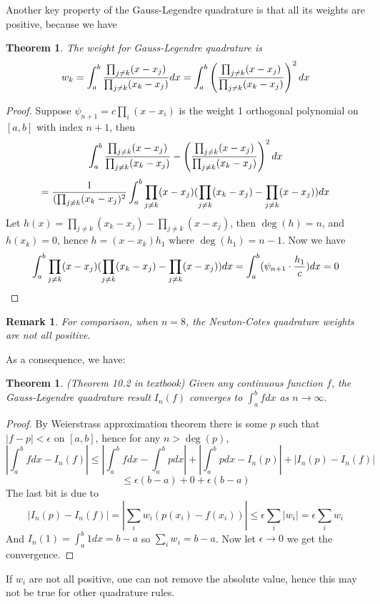 \documentclass[20pt]{article} %
\theoremstyle{break}
\newtheorem{thm}[definition]{Theorem}
\newtheorem{rem}[definition]{Remark}
\begin{document}
Another key property of the Gauss-Legendre quadrature is that all its weights are positive, because we have
\begin{thm}\label{pos_wt}
  The weight for Gauss-Legendre quadrature is
  \[w_k=\int_a^b{\prod_{j\not=k}(x-x_j)\over \prod_{j\not=k}(x_k-x_j)}dx=\int_a^b\left({\prod_{j\not=k}(x-x_j)\over \prod_{j\not=k}(x_k-x_j)}\right)^2dx\]
\end{thm}

\begin{proof}
Suppose $\psi_{n+1}=c\prod_i(x-x_i)$ is the weight 1 orthogonal polynomial on $[a, b]$ with index $n+1$, then
\[\int_a^b{\prod_{j\not=k}(x-x_j)\over \prod_{j\not=k}(x_k-x_j)}-\left({\prod_{j\not=k}(x-x_j)\over \prod_{j\not=k}(x_k-x_j)}\right)^2dx\]
\[={1\over(\prod_{j\not=k}(x_k-x_j)^2}\int_a^b\prod_{j\not=k}(x-x_j)(\prod_{j\not=k}(x_k-x_j)-\prod_{j\not=k}(x-x_j))dx\]
Let $h(x)=\prod_{j\not=k}(x_k-x_j)-\prod_{j\not=k}(x-x_j)$, then $\deg(h)=n$, and $h(x_k)=0$, hence $h=(x-x_k)h_1$ where $\deg(h_1)=n-1$. Now we have
\[\int_a^b\prod_{j\not=k}(x-x_j)(\prod_{j\not=k}(x_k-x_j)-\prod_{j\not=k}(x-x_j))dx=\int_a^b(\psi_{n+1}\cdot{h_1\over c})dx=0\]
\end{proof}

\newpage

\begin{rem} For comparison, when $n=8$, the Newton-Cotes quadrature weights are not all positive.\end{rem}

As a consequence, we have:
\begin{thm} (Theorem 10.2 in textbook) Given any continuous function $f$, the Gauss-Legendre quadrature result $I_n(f)$ converges to $\int_a^bfdx$ as $n\rightarrow\infty. $\end{thm}
\begin{proof}
  By Weierstrass approximation theorem there is some $p$ such that $|f-p|<\epsilon$ on $[a, b]$, hence for any $n>\deg(p)$,
  \[|\int_a^bfdx-I_n(f)|\leq |\int_a^bfdx-\int_a^bpdx|+|\int_a^bpdx-I_n(p)|+|I_n(p)-I_n(f)|\]
  \[\leq \epsilon(b-a)+0+\epsilon(b-a)\]
  The last bit is due to
  \[|I_n(p)-I_n(f)|=|\sum_iw_i(p(x_i)-f(x_i))|\leq \epsilon\sum_i|w_i|=\epsilon\sum_iw_i\]
  And $I_n(1)=\int_a^b1dx=b-a$ so $\sum_iw_i=b-a$.  Now let $\epsilon\rightarrow 0$ we get the convergence.
\end{proof}
If $w_i$ are not all positive, one can not remove the absolute value, hence this may not be true for other quadrature rules.

\newpage  
\end{document}
